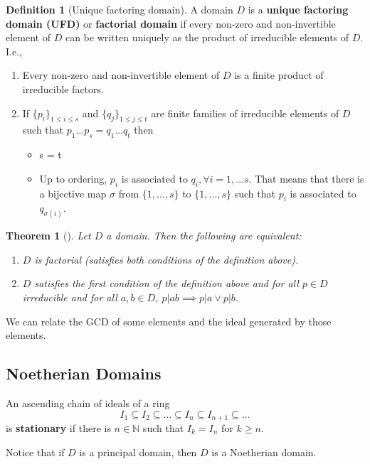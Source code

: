 \documentclass[12pt,a4paper]{article}
\newtheorem{theorem}{Theorem}[section]
\theoremstyle{definition}
\newtheorem{definition}{Definition}[section]
\begin{document}
\begin{definition}[Unique factoring domain]
A domain $D$ is a \textbf{unique factoring domain (UFD)} or \textbf{factorial domain} if every non-zero and non-invertible element of $D$ can be written uniquely as the product of irreducible elements of $D$. I.e.,
\begin{enumerate}
\item Every non-zero and non-invertible element of $D$ is a finite product of irreducible factors.
\item If $\{ p_i \}_{1 \leq i \leq s}$ and $\{ q_j \}_{1 \leq j \leq t}$ are finite families of irreducible elements of $D$ such that $p_1 \ldots p_s = q_1 \ldots q_t$ then
\begin{itemize}
\item s = t
\item Up to ordering, $p_i$ is associated to $q_i, \forall i = 1, \ldots s$. That means that there is a bijective map $\sigma$ from $\{ 1, \ldots, s \}$ to $\{ 1, \ldots, s \}$ such that $p_i$ is associated to $q_{\sigma (i)}$.
\end{itemize}
\end{enumerate}
\end{definition}

\begin{theorem}[]
Let $D$ a domain. Then the following are equivalent:
\begin{enumerate}
\item $D$ is factorial (satisfies both conditions of the definition above).
\item $D$ satisfies the first condition of the definition above and for all $p \in D$ irreducible and for all $a,b \in D$, $p | ab \implies p | a \lor p| b$.
\end{enumerate}
\end{theorem}

We can relate the GCD of some elements and the ideal generated by those elements.

\subsection{Noetherian Domains}

An ascending chain of ideals of a ring
\[
I_1 \subseteq I_2 \subseteq \ldots \subseteq I_n \subseteq I_{n+1} \subseteq \ldots
\]
is \textbf{stationary} if there is $n \in \mathbb{N}$ such that $I_k = I_n$ for $k \geq n$.

Notice that if $D$ is a principal domain, then $D$ is a Noetherian domain.
\end{document}
